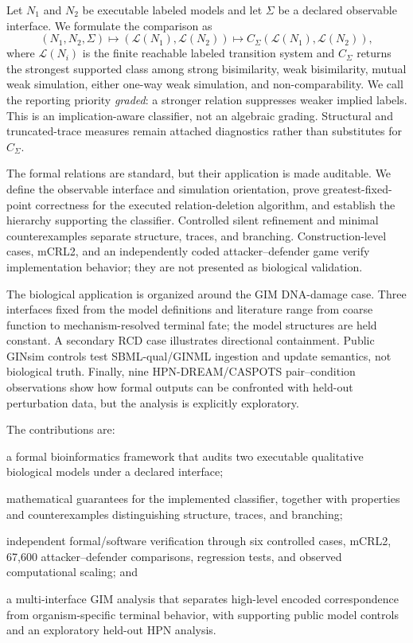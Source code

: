 \documentclass{ws-jbcb}
\numberwithin{equation}{section}
\newcommand{\LTS}{\mathcal{L}}
\begin{document}
Let $N_1$ and $N_2$ be executable labeled models and let $\Sigma$ be a declared
observable interface. We formulate the comparison as
\begin{equation}\label{eq:comparison-map}
 (N_1,N_2,\Sigma)
 \longmapsto (\LTS(N_1),\LTS(N_2))
 \longmapsto C_{\Sigma}(\LTS(N_1),\LTS(N_2)),
\end{equation}
where $\LTS(N_i)$ is the finite reachable labeled transition system and
$C_{\Sigma}$ returns the strongest supported class among strong bisimilarity,
weak bisimilarity, mutual weak simulation, either one-way weak simulation, and
non-comparability. We call the reporting priority \emph{graded}: a stronger
relation suppresses weaker implied labels. This is an implication-aware
classifier, not an algebraic grading. Structural and truncated-trace measures
remain attached diagnostics rather than substitutes for $C_{\Sigma}$.

The formal relations are standard, but their application is made auditable. We
define the observable interface and simulation orientation, prove
greatest-fixed-point correctness for the executed relation-deletion algorithm,
and establish the hierarchy supporting the classifier. Controlled silent
refinement and minimal counterexamples separate structure, traces, and
branching. Construction-level cases, mCRL2, and an independently coded
attacker--defender game verify implementation behavior; they are not presented
as biological validation.

The biological application is organized around the GIM DNA-damage case. Three
interfaces fixed from the model definitions and literature range from coarse
function to mechanism-resolved terminal fate; the model structures are held
constant. A secondary RCD case illustrates directional containment. Public
GINsim controls test SBML-qual/GINML ingestion and update semantics, not
biological truth.\cite{Naldi2018,Chaouiya2013SBML,Traynard2016,
AbouJaoude2009} Finally, nine HPN-DREAM/CASPOTS pair--condition observations
show how formal outputs can be confronted with held-out perturbation data, but
the analysis is explicitly exploratory.\cite{Hill2016,Razzaq2018}

The contributions are:
\begin{romanlist}[(iv)]
\item a formal bioinformatics framework that audits two executable qualitative
biological models under a declared interface;
\item mathematical guarantees for the implemented classifier, together with
properties and counterexamples distinguishing structure, traces, and branching;
\item independent formal/software verification through six controlled cases,
mCRL2, 67,600 attacker--defender comparisons, regression tests, and observed
computational scaling; and
\item a multi-interface GIM analysis that separates high-level encoded
correspondence from organism-specific terminal behavior, with supporting public
model controls and an exploratory held-out HPN analysis.
\end{romanlist}
\end{document}
